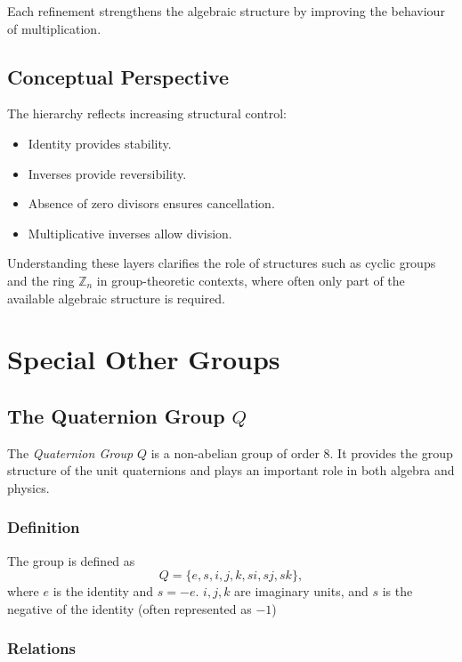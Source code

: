 \documentclass[a4paper,12pt]{article}
\theoremstyle{definition}
\begin{document}
Each refinement strengthens the algebraic structure by improving the behaviour of multiplication.

\subsection{Conceptual Perspective}

The hierarchy reflects increasing structural control:

\begin{itemize}
\item Identity provides stability.
\item Inverses provide reversibility.
\item Absence of zero divisors ensures cancellation.
\item Multiplicative inverses allow division.
\end{itemize}

Understanding these layers clarifies the role of structures such as cyclic groups and the ring $\mathbb{Z}_n$ in group-theoretic contexts, where often only part of the available algebraic structure is required.

\section{Special Other Groups}
\subsection{The Quaternion Group $Q$}

The \textit{Quaternion Group} $Q$ is a non-abelian group of order $8$. It provides the group structure of the unit quaternions and plays an important role in both algebra and physics.

\subsubsection*{Definition}

The group is defined as
\begin{equation*}
Q = \{e, s, i, j, k, si, sj, sk\},
\end{equation*}
where $e$ is the identity and $s = -e$. $i,j,k$ are imaginary units, and $s$ is the negative of the identity (often represented as $-1$)

\subsubsection*{Relations}
\end{document}
